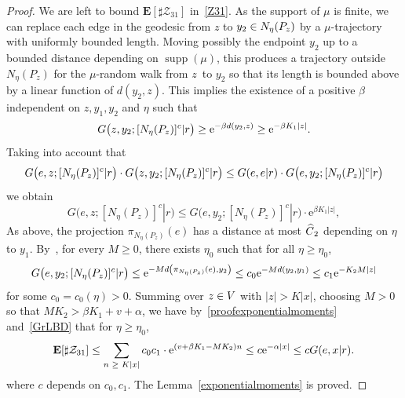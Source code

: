 \documentclass[AHL,Unicode,longabstracts]{cedram}
\newcommand{\rme}{\mathrm{e}}
\newcommand{\bfE}{\mathbf{E}}
\newcommand{\clZ}{\mathcal{Z}}
\DeclareMathOperator{\supp}{supp}
\let\originalleft\left
\let\originalright\right
\renewcommand{\left}{\mathopen{}\mathclose\bgroup\originalleft}
\renewcommand{\right}{\aftergroup\egroup\originalright}
\let\oldin\in
\renewcommand{\in}{\mathchoice{\oldin}{\oldin}{\,\oldin\,}{\,\oldin\,}}
\let\oldge\ge
\renewcommand{\ge}{\mathchoice{\oldge}{\oldge}{\,\oldge\,}{\,\oldge\,}}
\let\oldle\le
\renewcommand{\le}{\mathchoice{\oldle}{\oldle}{\,\oldle\,}{\,\oldle\,}}
\let\oldhat\hat
\renewcommand*{\hat}[1]{\mathchoice{\widehat{#1}}{\widehat{#1}}{\oldhat{#1}}{\oldhat{#1}}}
\begin{document}
\begin{proof}
We are left to bound $\bfE[\sharp \clZ_{31}]$ in~\eqref{Z31}. As the support of $\mu$ is finite, we can replace each edge in the geodesic from $z$ to $y_2\in N_\eta(P_z)$ by a $\mu$-trajectory with uniformly bounded length. Moving possibly the endpoint $y_2$ up to a bounded distance depending on $\supp(\mu)$, this produces a trajectory outside $N_\eta(P_z)$ for the $\mu$-random walk from $z$~to $y_2$ so that its length is bounded above by a linear function of $d(y_2,z)$. This implies the existence of a positive $\beta$ independent on $z, y_1,y_2$ and $\eta$ such that
\[
G\bigl(z,y_2;[N_\eta(P_z)]^c|r\bigr)\geq \rme^{-\beta d(y_2,z)}\ge \rme^{-\beta K_1 |z|}.
\]
Taking into account that
\[
G\bigl(e,z;[N_\eta(P_z)]^c|r\bigr) \cdot G\bigl(z,y_2;[N_\eta(P_z)]^c|r\bigr) \le G(e,e|r) \cdot G\bigl(e,y_2;[N_\eta(P_z)]^c|r\bigr)
\]
we obtain
\begin{equation}\label{proofexponentialmoments}
G\bigl(e,z;[N_\eta(P_z)]^c|r\bigr)\leq G\bigl(e,y_2;[N_\eta(P_z)]^c|r\bigr)\cdot \rme^{\beta K_1 |z|},
\end{equation}
As above, the projection $\pi_{N_{\eta}(P_z)}(e)$ has a distance at most $\hat C_2$ depending on $\eta$ to $y_1$. By~\cite[Lemma~2.12]{DWY}, for every $M\geq 0$, there exists $\eta_0$ such that for all $\eta\geq \eta_0$,
\[
G\bigl(e,y_2;[N_\eta(P_z)]^c|r\bigr)\leq \rme^{-M d\left(\pi_{N_{\eta}(P_z)}(e),y_2\right)}\leq c_0 \rme^{-M d(y_2,y_1)}\le c_1\rme^{-K_2 M|z|}
\]
for some $c_0=c_0(\eta)>0$.
Summing over $z\in V$ with $|z|>K|x|$, choosing $M>0$ so that $M K_2>\beta K_1+v+\alpha$, we have by~\eqref{proofexponentialmoments} and~\eqref{GrLBD} that for $\eta\geq \eta_0$,
\[
\bfE[\sharp \clZ_{31}]\leq \sum_{n\ge K|x|} c_0c_1 \cdot \rme^{(v+\beta K_1- M K_2)n}\le c\rme^{-\alpha |x|} \le c G(e,x|r).
\]
where $c$ depends on $c_0, c_1$. The Lemma~\ref{exponentialmoments} is proved.
\end{proof}
\end{document}
